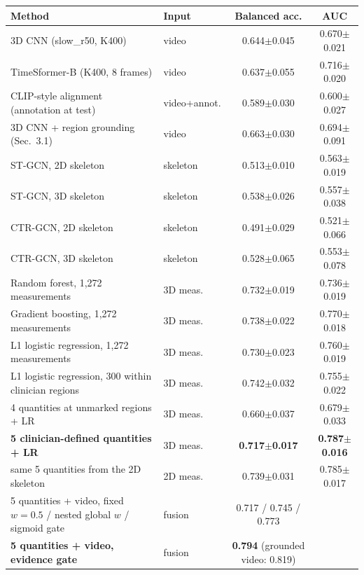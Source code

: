 \begin{tabular}{llcc}
\toprule
Method & Input & Balanced acc. & AUC \\
\midrule
3D CNN (slow\_r50, K400) & video & 0.644$\pm$0.045 & 0.670$\pm$0.021 \\
TimeSformer-B (K400, 8 frames) & video & 0.637$\pm$0.055 & 0.716$\pm$0.020 \\
CLIP-style alignment (annotation at test) & video+annot. & 0.589$\pm$0.030 & 0.600$\pm$0.027 \\
3D CNN + region grounding (Sec.~3.1) & video & 0.663$\pm$0.030 & 0.694$\pm$0.091 \\
ST-GCN, 2D skeleton & skeleton & 0.513$\pm$0.010 & 0.563$\pm$0.019 \\
ST-GCN, 3D skeleton & skeleton & 0.538$\pm$0.026 & 0.557$\pm$0.038 \\
CTR-GCN, 2D skeleton & skeleton & 0.491$\pm$0.029 & 0.521$\pm$0.066 \\
CTR-GCN, 3D skeleton & skeleton & 0.528$\pm$0.065 & 0.553$\pm$0.078 \\
Random forest, 1,272 measurements & 3D meas. & 0.732$\pm$0.019 & 0.736$\pm$0.019 \\
Gradient boosting, 1,272 measurements & 3D meas. & 0.738$\pm$0.022 & 0.770$\pm$0.018 \\
L1 logistic regression, 1,272 measurements & 3D meas. & 0.730$\pm$0.023 & 0.760$\pm$0.019 \\
L1 logistic regression, 300 within clinician regions & 3D meas. & 0.742$\pm$0.032 & 0.755$\pm$0.022 \\
4 quantities at unmarked regions + LR & 3D meas. & 0.660$\pm$0.037 & 0.679$\pm$0.033 \\
\textbf{5 clinician-defined quantities + LR} & 3D meas. & \textbf{0.717$\pm$0.017} & \textbf{0.787$\pm$0.016} \\
same 5 quantities from the 2D skeleton & 2D meas. & 0.739$\pm$0.031 & 0.785$\pm$0.017 \\
\midrule
5 quantities + video, fixed $w{=}0.5$ / nested global $w$ / sigmoid gate & fusion & 0.717 / 0.745 / 0.773 & \\
\textbf{5 quantities + video, evidence gate} & fusion & \textbf{0.794} (grounded video: 0.819) & \\
\bottomrule
\end{tabular}
